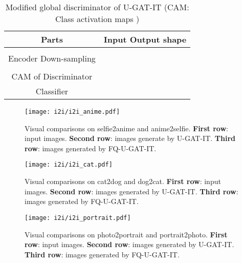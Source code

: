 \documentclass{article}
\begin{document}
\begin{table}[!t]
    \centering
    \caption{Modified global discriminator of U-GAT-IT (CAM: Class activation maps \citep{zhou2016learning})}
    \vspace{0.1in}
    \begin{tabular}{c|c}
        \toprule
        Parts & Input  Output shape \\\midrule
    \multirow{7}{*}{Encoder Down-sampling}  &   \\
        &    \\ 
        &   \\ & \textcolor{blue}{} \\
        &   \\ 
        &   \\
        &   \\ \midrule 
        \multirow{2}{*}{CAM of Discriminator} &  \\ 
        &  \\ \midrule
       Classifier & 
        \\ \bottomrule
    \end{tabular}

    \label{tab:arch_ugatit}
    \end{table}
    
    
\begin{figure*}[!htbp]
    \centering
    \texttt{[image: i2i/i2i\_anime.pdf]}
    \caption{Visual comparisons on selfie2anime and anime2selfie. \textbf{First row}: input images. \textbf{Second row}: images generate by U-GAT-IT. \textbf{Third row}: images generated by FQ-U-GAT-IT.}
    \label{fig:i2i_anime}
\end{figure*}

\begin{figure*}[!htbp]
    \centering
    \texttt{[image: i2i/i2i\_cat.pdf]}
    \caption{Visual comparisons on cat2dog and dog2cat. \textbf{First row}: input images. \textbf{Second row}: images generated by U-GAT-IT. \textbf{Third row}: images generated by FQ-U-GAT-IT.}
    \label{fig:i2i_cat}
\end{figure*}

\begin{figure*}[!htbp]
    \centering
    \texttt{[image: i2i/i2i\_portrait.pdf]}
    \caption{Visual comparisons on photo2portrait and portrait2photo. \textbf{First row}: input images. \textbf{Second row}: images generated by U-GAT-IT. \textbf{Third row}: images generated by FQ-U-GAT-IT.}
    \label{fig:i2i_portrait}
\end{figure*}
\end{document}
